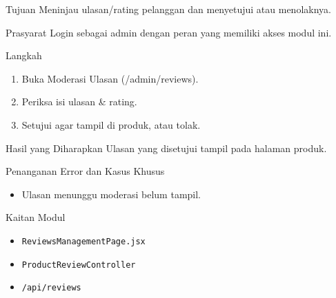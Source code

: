 
\begin{flowsection}{Tujuan}
Meninjau ulasan/rating pelanggan dan menyetujui atau menolaknya.
\end{flowsection}

\begin{flowsection}{Prasyarat}
Login sebagai admin dengan peran yang memiliki akses modul ini.
\end{flowsection}

\begin{flowsection}{Langkah}
\begin{enumerate}
  \item Buka Moderasi Ulasan (/admin/reviews).
  \item Periksa isi ulasan \&  rating.
  \item Setujui agar tampil di produk, atau tolak.
\end{enumerate}
\end{flowsection}


\begin{flowsection}{Hasil yang Diharapkan}
Ulasan yang disetujui tampil pada halaman produk.
\end{flowsection}

\begin{flowsection}{Penanganan Error dan Kasus Khusus}
\begin{itemize}
  \item Ulasan menunggu moderasi belum tampil.
\end{itemize}
\end{flowsection}

\begin{flowsection}{Kaitan Modul}
\begin{itemize}
  \item \texttt{ReviewsManagementPage.jsx}
  \item \texttt{ProductReviewController}
  \item \texttt{/api/reviews}
\end{itemize}
\end{flowsection}


